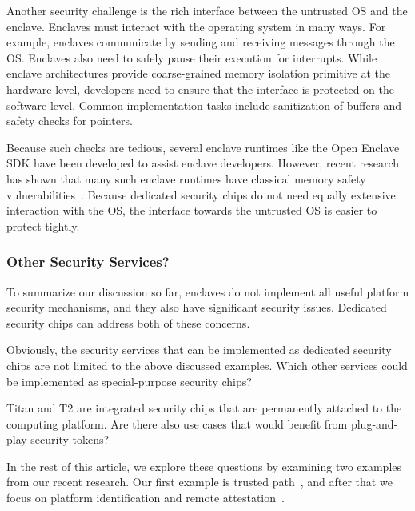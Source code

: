 Another security challenge is the rich interface between the untrusted OS and the enclave. Enclaves must interact with the operating system in many ways. For example, enclaves communicate by sending and receiving messages through the OS. Enclaves also need to safely pause their execution for interrupts. While enclave architectures provide coarse-grained memory isolation primitive at the hardware level, developers need to ensure that the interface is protected on the software level. Common implementation tasks include sanitization of buffers and safety checks for pointers. 

Because such checks are tedious, several enclave runtimes like the Open Enclave SDK have been developed to assist enclave developers. However, recent research has shown that many such enclave runtimes have classical memory safety vulnerabilities~\cite{van2019tale}. Because dedicated security chips do not need equally extensive interaction with the OS, the interface towards the untrusted OS is easier to protect tightly. 


\subsubsection*{Other Security Services?}

To summarize our discussion so far, enclaves do not implement all useful platform security mechanisms, and they also have significant security issues. Dedicated security chips can address both of these concerns. 

Obviously, the security services that can be implemented as dedicated security chips are not limited to the above discussed examples. Which other services could be implemented as special-purpose security chips? 

Titan and T2 are integrated security chips that are permanently attached to the computing platform. Are there also use cases that would benefit from plug-and-play security tokens?

In the rest of this article, we explore these questions by examining two examples from our recent research. Our first example is trusted path~\cite{protection}, %
and after that we focus on platform identification and remote attestation~\cite{proximitee}. 
